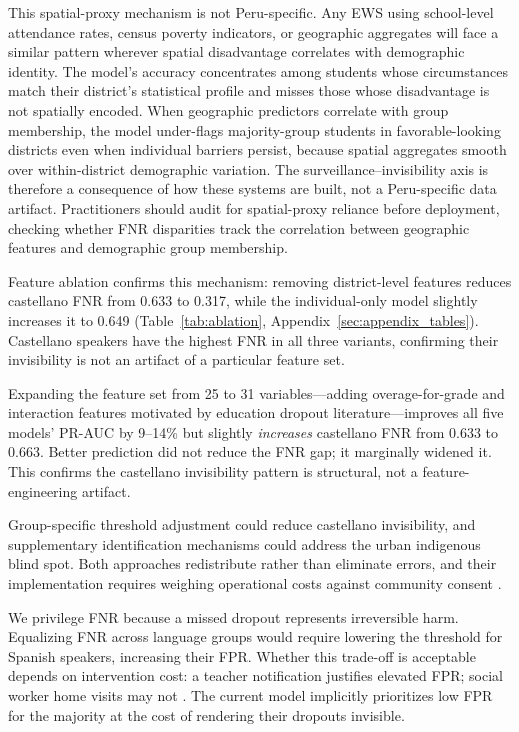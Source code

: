 \documentclass[notitlepage,12pt]{jedm}
\begin{document}
This spatial-proxy mechanism is not Peru-specific. Any EWS using school-level attendance rates, census poverty indicators, or geographic aggregates will face a similar pattern wherever spatial disadvantage correlates with demographic identity. The model's accuracy concentrates among students whose circumstances match their district's statistical profile and misses those whose disadvantage is not spatially encoded. When geographic predictors correlate with group membership, the model under-flags majority-group students in favorable-looking districts even when individual barriers persist, because spatial aggregates smooth over within-district demographic variation. The surveillance--invisibility axis is therefore a consequence of how these systems are built, not a Peru-specific data artifact. Practitioners should audit for spatial-proxy reliance before deployment, checking whether FNR disparities track the correlation between geographic features and demographic group membership.

Feature ablation confirms this mechanism: removing district-level features reduces castellano FNR from 0.633 to 0.317, while the individual-only model slightly increases it to 0.649 (Table~\ref{tab:ablation}, Appendix~\ref{sec:appendix_tables}). Castellano speakers have the highest FNR in all three variants, confirming their invisibility is not an artifact of a particular feature set.

Expanding the feature set from 25 to 31 variables---adding overage-for-grade and interaction features motivated by education dropout literature---improves all five models' PR-AUC by 9--14\% but slightly \emph{increases} castellano FNR from 0.633 to 0.663. Better prediction did not reduce the FNR gap; it marginally widened it. This confirms the castellano invisibility pattern is structural, not a feature-engineering artifact.

Group-specific threshold adjustment could reduce castellano invisibility, and supplementary identification mechanisms could address the urban indigenous blind spot. Both approaches redistribute rather than eliminate errors, and their implementation requires weighing operational costs against community consent \cite{mcmahon2020reenvisioning}.

We privilege FNR because a missed dropout represents irreversible harm. Equalizing FNR across language groups would require lowering the threshold for Spanish speakers, increasing their FPR. Whether this trade-off is acceptable depends on intervention cost: a teacher notification justifies elevated FPR; social worker home visits may not \cite{mcmahon2020reenvisioning,chouldechova2017fair}. The current model implicitly prioritizes low FPR for the majority at the cost of rendering their dropouts invisible.
\end{document}
